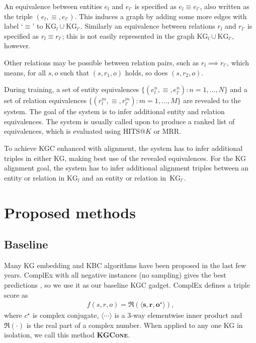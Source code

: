 \documentclass[11pt]{article}
\def\KG{\ensuremath{\text{KG}}}
\def\KbcOne{\textsc{KGC\-one}}
\begin{document}
An equivalence between entities $e_{l}$ and $e_{l'}$ is specified as $e_{l} \equiv e_{l'}$, also written as the triple $(e_{l}, \equiv, e_{l'})$.
This induces a graph by adding some more edges with label `$\equiv$' to $\KG_{l} \cup \KG_{l'}$.
Similarly an equivalence between relations $r_{l}$ and $r_{l'}$ is specified as $r_{l} \equiv r_{l'}$; this is not easily represented in the graph $\KG_{l}\cup\KG_{l'}$, however.

Other relations may be possible between relation pairs, such as $r_{l} \implies r_{l'}$, which means, for all $s, o$ such that $(s,r_1,o)$ holds, so does $(s,r_2,o)$.

During training, a set of entity equivalences
$\{ (e^n_{l}, \equiv, e^n_{l'}): n=1,\ldots,N \}$ and a set of relation equivalences $\{ (r^m_{l}, \equiv, r^m_{l'}):  m=1,\ldots,M \}$ are revealed to the system.  The goal of the system is to infer additional entity and relation equivalences.  The system is usually called upon to produce a ranked list of equivalences, which is evaluated using HITS@$K$ or MRR.

To achieve KGC enhanced with alignment, the system has to infer additional triples in either KG, making best use of the revealed equivalences.  For the KG alignment goal, the system has to infer additional alignment triples between an entity or relation in $\KG_{l}$ and an entity or relation in~$\KG_{l'}$.


\section{Proposed methods}
\label{sec:Method}

\subsection{Baseline}

Many KG embedding and KBC algorithms have been proposed in the last few years.  ComplEx \citep{trouillon2016complex} with all negative instances (no sampling) gives the best predictions \citep{jain-baseline}, so we use it as our baseline KGC gadget.  ComplEx defines a triple score as 
\begin{align}
\label{eq:complex}
f(s,r,o) = \Re\left( \langle \bm{s}, \bm{r}, \bm{o}^\star \rangle \right),
\end{align}  
where $c^\star$ is complex conjugate, $\langle\cdots\rangle$ is a 3-way elementwise inner product and $\Re(\cdot)$ is the real part of a complex number.   When applied to any one KG in isolation, we call this method \textbf{\KbcOne{}}.
\end{document}
